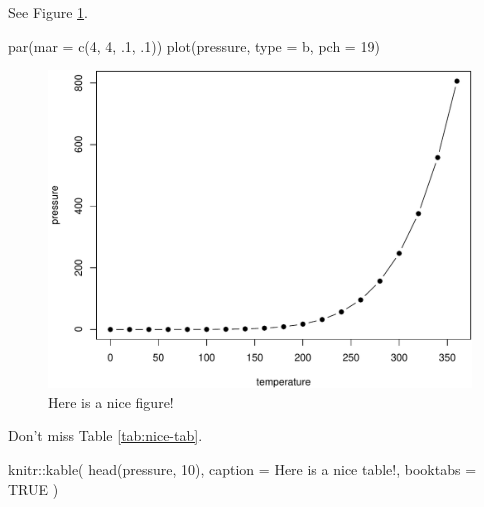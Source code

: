 \documentclass[
  12pt,
]{book}
\newenvironment{Shaded}{\begin{snugshade}}{\end{snugshade}}
\newcommand{\AttributeTok}[1]{\textcolor[rgb]{0.77,0.63,0.00}{#1}}
\newcommand{\ConstantTok}[1]{\textcolor[rgb]{0.00,0.00,0.00}{#1}}
\newcommand{\DecValTok}[1]{\textcolor[rgb]{0.00,0.00,0.81}{#1}}
\newcommand{\FunctionTok}[1]{\textcolor[rgb]{0.00,0.00,0.00}{#1}}
\newcommand{\NormalTok}[1]{#1}
\newcommand{\SpecialCharTok}[1]{\textcolor[rgb]{0.00,0.00,0.00}{#1}}
\newcommand{\StringTok}[1]{\textcolor[rgb]{0.31,0.60,0.02}{#1}}
\theoremstyle{definition}
\theoremstyle{definition}
\theoremstyle{definition}
\theoremstyle{definition}
\theoremstyle{remark}
\begin{document}
See Figure \ref{fig:nice-fig}.

\begin{Shaded}
\begin{Highlighting}[]
\FunctionTok{par}\NormalTok{(}\AttributeTok{mar =} \FunctionTok{c}\NormalTok{(}\DecValTok{4}\NormalTok{, }\DecValTok{4}\NormalTok{, .}\DecValTok{1}\NormalTok{, .}\DecValTok{1}\NormalTok{))}
\FunctionTok{plot}\NormalTok{(pressure, }\AttributeTok{type =} \StringTok{\textquotesingle{}b\textquotesingle{}}\NormalTok{, }\AttributeTok{pch =} \DecValTok{19}\NormalTok{)}
\end{Highlighting}
\end{Shaded}

\begin{figure}

{\centering \includegraphics[width=0.8\linewidth]{figurasnice-fig-1} 

}

\caption{Here is a nice figure!}\label{fig:nice-fig}
\end{figure}

Don't miss Table \ref{tab:nice-tab}.

\begin{Shaded}
\begin{Highlighting}[]
\NormalTok{knitr}\SpecialCharTok{::}\FunctionTok{kable}\NormalTok{(}
  \FunctionTok{head}\NormalTok{(pressure, }\DecValTok{10}\NormalTok{), }\AttributeTok{caption =} \StringTok{\textquotesingle{}Here is a nice table!\textquotesingle{}}\NormalTok{,}
  \AttributeTok{booktabs =} \ConstantTok{TRUE}
\NormalTok{)}
\end{Highlighting}
\end{Shaded}
\end{document}
